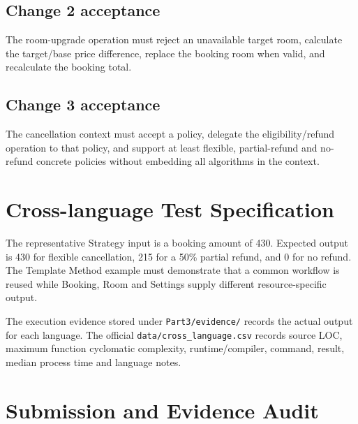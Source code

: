 \documentclass[10pt,a4paper]{article}
\newcommand{\code}[1]{\texttt{\small #1}}
\begin{document}
\subsection{Change 2 acceptance}

The room-upgrade operation must reject an unavailable target room, calculate the target/base price difference, replace the booking room when valid, and recalculate the booking total.

\subsection{Change 3 acceptance}

The cancellation context must accept a policy, delegate the eligibility/refund operation to that policy, and support at least flexible, partial-refund and no-refund concrete policies without embedding all algorithms in the context.

\section{Cross-language Test Specification}

The representative Strategy input is a booking amount of 430. Expected output is 430 for flexible cancellation, 215 for a 50\% partial refund, and 0 for no refund. The Template Method example must demonstrate that a common workflow is reused while Booking, Room and Settings supply different resource-specific output.

The execution evidence stored under \code{Part3/evidence/} records the actual output for each language. The official \code{data/cross\_language.csv} records source LOC, maximum function cyclomatic complexity, runtime/compiler, command, result, median process time and language notes.

\section{Submission and Evidence Audit}
\end{document}
